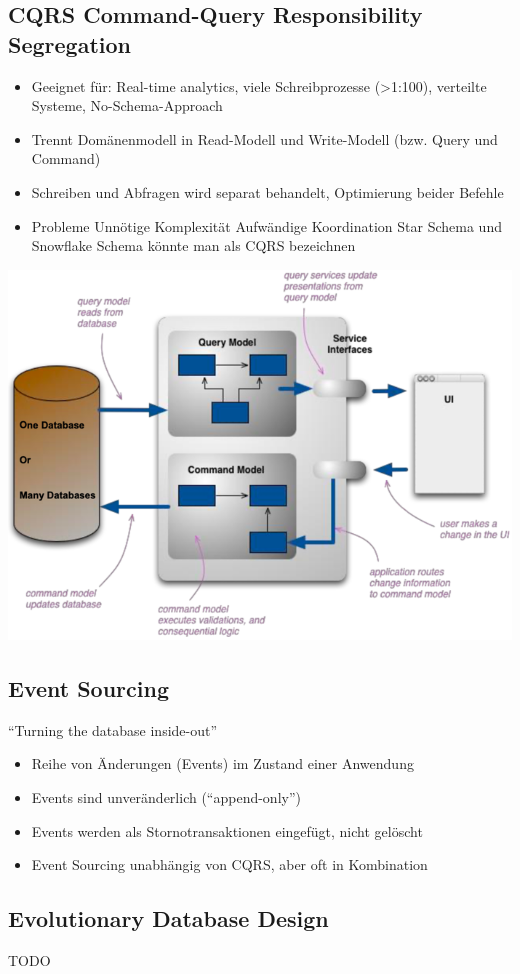 \documentclass[a4paper, landscape, 8pt]{scrartcl}
\begin{document}
\begin{multicols*}{4}
        \subsection{CQRS {\tiny Command-Query Responsibility Segregation}}
        \begin{itemize}
            \item Geeignet für: Real-time analytics, viele Schreibprozesse (>1:100), verteilte Systeme, No-Schema-Approach
            \item Trennt Domänenmodell in Read-Modell und Write-Modell (bzw. Query und Command)
            \item Schreiben und Abfragen wird separat behandelt, Optimierung beider Befehle
            \item Probleme
            \subitem Unnötige Komplexität
            \subitem Aufwändige Koordination
            \subitem Star Schema und Snowflake Schema könnte man als CQRS bezeichnen
        \end{itemize}
        \includegraphics[width=\columnwidth]{graphic/11-cqrs-modell}

        \subsection{Event Sourcing}
        \enquote{Turning the database inside-out}
        \begin{itemize}
            \item Reihe von Änderungen (Events) im Zustand einer Anwendung
            \item Events sind unveränderlich (\enquote{append-only})
            \item Events werden als Stornotransaktionen eingefügt, nicht gelöscht
            \item Event Sourcing unabhängig von CQRS, aber oft in Kombination
        \end{itemize}

        \subsection{Evolutionary Database Design}
        TODO

    \end{multicols*}
\end{document}
